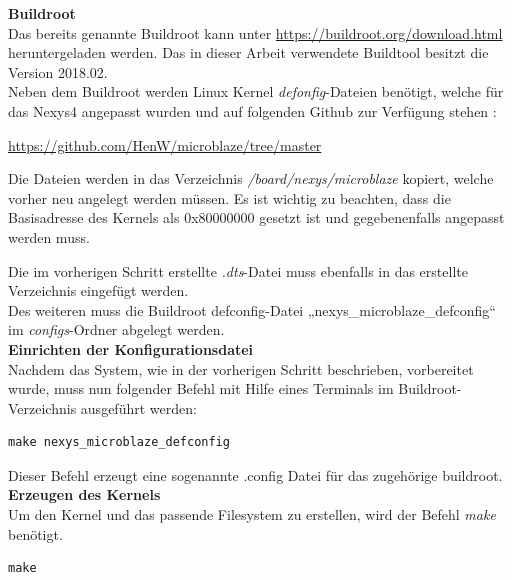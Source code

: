 \textbf{Buildroot}\\

Das bereits genannte Buildroot kann unter \url{https://buildroot.org/download.html} heruntergeladen werden.
Das in dieser Arbeit verwendete Buildtool besitzt die Version 2018.02.\\
Neben dem Buildroot werden Linux Kernel \emph{defonfig}-Dateien benötigt, welche für das Nexys4 angepasst wurden und auf folgenden Github zur Verfügung stehen :

\url{https://github.com/HenW/microblaze/tree/master}

Die Dateien werden in das Verzeichnis \emph{/board/nexys/microblaze} kopiert, welche vorher neu angelegt werden müssen.
 Es ist wichtig zu beachten, dass die Basisadresse des Kernels als 0x80000000 gesetzt ist und gegebenenfalls angepasst werden muss.

Die im vorherigen Schritt erstellte \emph{.dts}-Datei muss ebenfalls in das erstellte Verzeichnis eingefügt werden.\\

Des weiteren muss die Buildroot defconfig-Datei „nexys\_microblaze\_defconfig“ im \emph{configs}-Ordner abgelegt werden.\\

\textbf{Einrichten der Konfigurationsdatei}\\

Nachdem das System, wie in der vorherigen Schritt beschrieben,
vorbereitet wurde, muss nun folgender Befehl mit Hilfe eines Terminals im Buildroot-Verzeichnis ausgeführt werden:\\

\begin{lstlisting}[caption={Generierung der \emph{defconf}-Datei},label={code:mbdefconf}]
  make nexys_microblaze_defconfig
 \end{lstlisting}


Dieser Befehl erzeugt eine sogenannte .config Datei für das zugehörige buildroot.\\

\textbf{Erzeugen des Kernels}\\

Um den Kernel und das passende Filesystem zu erstellen, wird der Befehl \emph{make} benötigt.\\

\begin{lstlisting}[caption={Erstellung des Kernels},label={code:mbkernel}]
  make
   \end{lstlisting}

